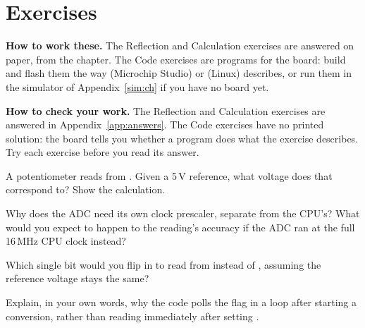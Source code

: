
\section{Exercises}
\label{c4:sec:exercises}\label{c4:app:b}

\begin{aside}
\textbf{How to work these.} The Reflection and Calculation exercises are answered on paper, from
the chapter. The Code exercises are programs for the board: build and flash them the way
 (Microchip Studio) or  (Linux) describes, or run them in the
simulator of Appendix~\ref{sim:ch} if you have no board yet.

\textbf{How to check your work.} The Reflection and Calculation exercises are answered in
Appendix~\ref{app:answers}. The Code exercises have no printed solution: the board tells you
whether a program does what the exercise describes. Try each exercise before you read its answer.
\end{aside}

\label{c4:set:1}

\label{c4:ex:1}
A potentiometer reads  from . Given a 5\,V reference, what voltage does
that correspond to? Show the calculation.

\label{c4:ex:2}
Why does the ADC need its own clock prescaler, separate from the CPU's? What would you expect to
happen to the reading's accuracy if the ADC ran at the full 16\,MHz CPU clock instead?

\label{c4:set:2}

\label{c4:ex:3}
Which single bit would you flip in  to read from  instead of ,
assuming the reference voltage stays the same?

\label{c4:ex:4}
Explain, in your own words, why the code polls the  flag in a  loop after
starting a conversion, rather than reading  immediately after setting .

\label{c4:set:3}


